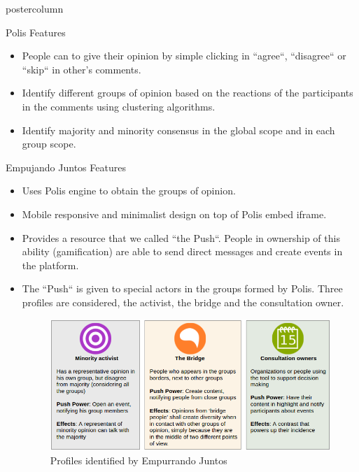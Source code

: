 \documentclass[final,hyperref={pdfpagelabels=false}]{beamer}
\begin{document}
\begin{frame}
\begin{columns}
\begin{column}{.49\textwidth}
\begin{beamercolorbox}[center,wd=\textwidth]{postercolumn}
\begin{minipage}[T]{.95\textwidth}
{\begin{block}{Polis Features}
\begin{itemize}
    \item People can to give their opinion by simple clicking in ``agree``,
    ``disagree`` or ``skip`` in other's comments.

    \item Identify different groups of opinion based on the reactions of the
    participants in the comments using clustering algorithms.

    \item Identify majority and minority consensus in the global scope and in
    each group scope.
  \end{itemize}
\end{block}

\begin{block}{Empujando Juntos Features}
  \begin{itemize}
    \item Uses Polis engine to obtain the groups of opinion.

    \item Mobile responsive and minimalist design on top of Polis embed iframe.

    \item Provides a resource that we called ``the Push``. People in ownership of
    this ability (gamification) are able to send direct messages and create events in the platform.

    \item The ``Push`` is given to special actors in the groups formed by Polis.
    Three profiles are considered, the activist, the bridge and the consultation
    owner.

    \begin{figure}
      \begin{center}
        \includegraphics[scale=1.3]{../images/userprofiles.png}
        \caption{Profiles identified by Empurrando Juntos}
        \label{fig:background:free-software-repository}
      \end{center}
    \end{figure}


\end{itemize}
\end{block}}
\end{minipage}
\end{beamercolorbox}
\end{column}
\end{columns}
\end{frame}
\end{document}
